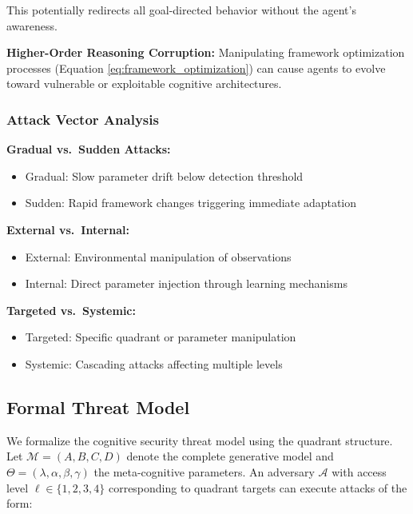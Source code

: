 \documentclass[
]{article}
\providecommand{\tightlist}{%
  \setlength{\itemsep}{0pt}\setlength{\parskip}{0pt}}
\begin{document}
This potentially redirects all goal-directed behavior without the
agent's awareness.

\textbf{Higher-Order Reasoning Corruption:} Manipulating framework
optimization processes (Equation \eqref{eq:framework_optimization}) can
cause agents to evolve toward vulnerable or exploitable cognitive
architectures.

\subsubsection{Attack Vector Analysis}\label{attack-vector-analysis}

\textbf{Gradual vs.~Sudden Attacks:}

\begin{itemize}
\tightlist
\item
  Gradual: Slow parameter drift below detection threshold
\item
  Sudden: Rapid framework changes triggering immediate adaptation
\end{itemize}

\textbf{External vs.~Internal:}

\begin{itemize}
\tightlist
\item
  External: Environmental manipulation of observations
\item
  Internal: Direct parameter injection through learning mechanisms
\end{itemize}

\textbf{Targeted vs.~Systemic:}

\begin{itemize}
\tightlist
\item
  Targeted: Specific quadrant or parameter manipulation
\item
  Systemic: Cascading attacks affecting multiple levels
\end{itemize}

\subsection{Formal Threat Model}\label{sec:threat_model}

We formalize the cognitive security threat model using the quadrant
structure. Let \(\mathcal{M} = (A, B, C, D)\) denote the complete
generative model and \(\Theta = (\lambda, \alpha, \beta, \gamma)\) the
meta-cognitive parameters. An adversary \(\mathcal{A}\) with access
level \(\ell \in \{1,2,3,4\}\) corresponding to quadrant targets can
execute attacks of the form:
\end{document}
